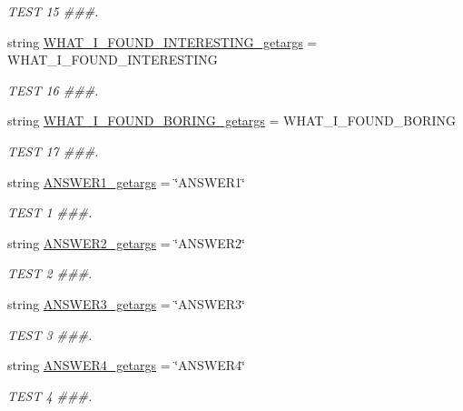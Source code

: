 \begin{DoxyCompactItemize}
\begin{DoxyCompactList}\small\item\em T\+E\+S\+T 15 \#\#\#. \end{DoxyCompactList}\item 
string \hyperlink{namespacetests_aa3a60dfc9a3b5ec5715a10aced17ed8e}{W\+H\+A\+T\+\_\+\+I\+\_\+\+F\+O\+U\+N\+D\+\_\+\+I\+N\+T\+E\+R\+E\+S\+T\+I\+N\+G\+\_\+getargs} = \textquotesingle{}W\+H\+A\+T\+\_\+\+I\+\_\+\+F\+O\+U\+N\+D\+\_\+\+I\+N\+T\+E\+R\+E\+S\+T\+I\+N\+G\textquotesingle{}
\begin{DoxyCompactList}\small\item\em T\+E\+S\+T 16 \#\#\#. \end{DoxyCompactList}\item 
string \hyperlink{namespacetests_af14077e20d51a6f1129ccf4dc8b4db3f}{W\+H\+A\+T\+\_\+\+I\+\_\+\+F\+O\+U\+N\+D\+\_\+\+B\+O\+R\+I\+N\+G\+\_\+getargs} = \textquotesingle{}W\+H\+A\+T\+\_\+\+I\+\_\+\+F\+O\+U\+N\+D\+\_\+\+B\+O\+R\+I\+N\+G\textquotesingle{}
\begin{DoxyCompactList}\small\item\em T\+E\+S\+T 17 \#\#\#. \end{DoxyCompactList}\item 
string \hyperlink{namespacetests_a10c32ad045f7c3fbe53ea5c04b2efe80}{A\+N\+S\+W\+E\+R1\+\_\+getargs} = \char`\"{}A\+N\+S\+W\+E\+R1\char`\"{}
\begin{DoxyCompactList}\small\item\em T\+E\+S\+T 1 \#\#\#. \end{DoxyCompactList}\item 
string \hyperlink{namespacetests_a5ea93641e8fbe1acbcb6725845c4c679}{A\+N\+S\+W\+E\+R2\+\_\+getargs} = \char`\"{}A\+N\+S\+W\+E\+R2\char`\"{}
\begin{DoxyCompactList}\small\item\em T\+E\+S\+T 2 \#\#\#. \end{DoxyCompactList}\item 
string \hyperlink{namespacetests_a4a97e005b11d1d486c0d893c33976136}{A\+N\+S\+W\+E\+R3\+\_\+getargs} = \char`\"{}A\+N\+S\+W\+E\+R3\char`\"{}
\begin{DoxyCompactList}\small\item\em T\+E\+S\+T 3 \#\#\#. \end{DoxyCompactList}\item 
string \hyperlink{namespacetests_aeb48fc0597680aa32baa2ea0810d63d9}{A\+N\+S\+W\+E\+R4\+\_\+getargs} = \char`\"{}A\+N\+S\+W\+E\+R4\char`\"{}
\begin{DoxyCompactList}\small\item\em T\+E\+S\+T 4 \#\#\#. \end{DoxyCompactList}\item 

\end{DoxyCompactItemize}
